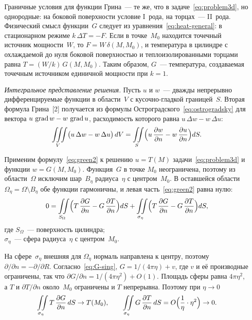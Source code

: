 Граничные условия для функции Грина~— те же, что в
задаче~\eqref{eq:problem3d}, но однородные: на боковой поверхности
условие I~рода, на торцах~— II~рода. Физический смысл функции~$G$
следует из уравнения~\eqref{eq:heat-general}: в стационарном режиме
$k\,\Delta T=-F$. Если в точке~$M_0$ находится точечный источник
мощности~$W$, то $F=W\,\delta(M,M_0)$, и температура в цилиндре
с охлаждаемой до нуля боковой поверхностью и теплоизолированными торцами
равна $T=(W/k)\,G(M,M_0)$. Таким образом, $G$~— температура, создаваемая
точечным источником единичной мощности при $k=1$.

\emph{Интегральное представление решения.} Пусть $u$ и $w$~— дважды
непрерывно дифференцируемые функции в области~$V$ с кусочно-гладкой
границей~$S$. Вторая формула Грина~[2] получается из формулы
Остроградского~\eqref{eq:ostrogradsky} для вектора
$u\,\operatorname{grad} w-w\,\operatorname{grad} u$, расходимость которого равна
$u\,\Delta w-w\,\Delta u$:
\begin{equation}
\label{eq:green2}
\iiint\limits_V\bigl(u\,\Delta w-w\,\Delta u\bigr)\,dV
=\iint\limits_S\Bigl(u\,\dfrac{\partial w}{\partial n}-w\,\dfrac{\partial u}{\partial n}\Bigr)dS .
\end{equation}

Применим формулу~\eqref{eq:green2} к решению $u=T(M)$
задачи~\eqref{eq:problem3d} и функции $w=G(M,M_0)$. Функция~$G$ в точке
$M_0$ неограничена, поэтому из области~$\Omega$ исключим шар~$B_\eta$
радиуса~$\eta$ с центром~$M_0$. В оставшейся области
$\Omega_\eta=\Omega\setminus B_\eta$ обе функции гармоничны,
и левая часть~\eqref{eq:green2} равна нулю:
\begin{equation}
\label{eq:green-eps}
0=\iint\limits_{S_\Omega}\Bigl(T\,\pd{G}{n}-G\,\pd{T}{n}\Bigr)dS
+\iint\limits_{\sigma_\eta}\Bigl(T\,\pd{G}{n}-G\,\pd{T}{n}\Bigr)dS,
\postdisplaypenalty=10000
\end{equation}
где $S_\Omega$~— поверхность цилиндра;\\
\hphantom{где }$\sigma_\eta$~— сфера радиуса~$\eta$
с центром~$M_0$.

На сфере~$\sigma_\eta$ внешняя для $\Omega_\eta$ нормаль
направлена к центру, поэтому $\partial/\partial n=-\partial/\partial R$.
Согласно~\eqref{eq:G-sing}, $G=1/(4\pi\eta)+v$, где $v$ и её
производные ограничены, так что
$\partial G/\partial n=1/(4\pi\eta^2)+O(1)$. Площадь сферы равна
$4\pi\eta^2$, а $T$ и $\partial T/\partial n$ около~$M_0$
ограничены и $T$ непрерывна. Поэтому при $\eta\to0$
\begin{equation}
\label{eq:sphere-limit}
\iint\limits_{\sigma_\eta}T\,\dfrac{\partial G}{\partial n}\,dS\to T(M_0),\qquad
\iint\limits_{\sigma_\eta}G\,\dfrac{\partial T}{\partial n}\,dS
=O\Bigl(\frac{1}{\eta}\cdot\eta^{2}\Bigr)\to 0 .
\end{equation}

